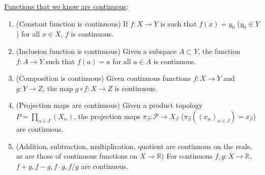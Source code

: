 \documentclass[letterpaper, 12pt]{article}
\newcommand{\RR}{\mathbb{R}}
\newcommand{\ms}[1]{\mathscr{#1}}
\begin{document}
\begin{enumerate}[resume]
        \underline{Functions that we know are continuous}:
            \begin{enumerate}
            \item (Constant function is continuous) If $f:X\to Y$ is such that $f(x) = y_0$ ($y_0\in Y$) for all $x\in X$, $f$ is continuous.
            \item (Inclusion function is continuous) Given a subspace $A\subset Y$, the function $f:A\to Y$ such that $f(a) = a$ for all $a\in A$ is continuous.
            \item (Composition is continuous) Given continuous functions $f:X\to Y$ and $g:Y\to Z$, the map $g\circ f : X\to Z$ is continuous.
            \item (Projection maps are continuous) Given a product topology $P = \prod_{\alpha\in J}(X_\alpha)$, the projection maps $\pi_\beta : \ms{P} \to X_\beta$ ($\pi_\beta((x_\alpha)_{\alpha\in J}) = x_\beta$) are continuous.
            \item (Addition, subtraction, multiplication, quotient are continuous on the reals, as are those of continuous functions on $X\to \RR$) For continuous $f,g:X\to\RR$, $f+g, f-g, f\cdot g, f/g$ are continuous.


\end{enumerate}
\end{enumerate}
\end{document}
